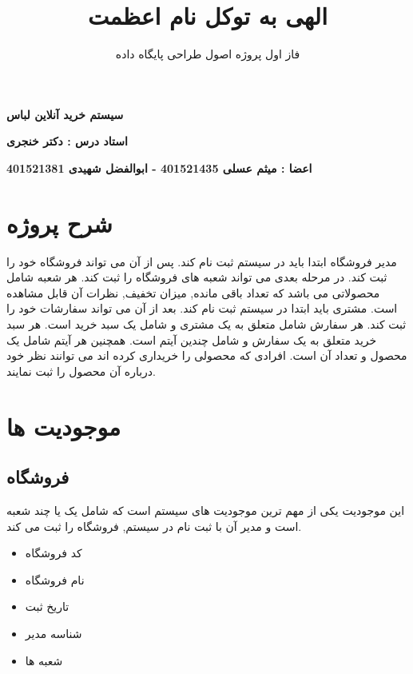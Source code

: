 \documentclass[]{article}
\title{ الهی به توکل نام اعظمت  }
\author{
فاز اول پروژه اصول طراحی پایگاه داده
 }
\begin{document}
\maketitle

\begin{center}
\textbf{سیستم خرید آنلاین لباس}
\end{center}

\begin{center}
\textbf{ استاد درس : دکتر خنجری   }
\end{center}
\begin{center}
\textbf{ اعضا : میثم عسلی 401521435 - ابوالفضل شهیدی 401521381}
\end{center}

\newpage
\tableofcontents
\newpage
\section{شرح پروژه}
مدیر فروشگاه ابتدا باید در سیستم ثبت نام کند. پس از آن می تواند فروشگاه خود را ثبت کند. در مرحله بعدی می تواند شعبه های فروشگاه را ثبت کند. هر شعبه شامل محصولاتی می باشد که تعداد باقی مانده, میزان تخفیف, نظرات آن قابل مشاهده است. 
مشتری باید ابتدا در سیستم ثبت نام کند. بعد از آن می تواند سفارشات خود را ثبت کند.
هر سفارش شامل متعلق به یک مشتری و شامل یک سبد خرید است. 
هر سبد خرید متعلق به یک سفارش و شامل چندین آیتم است.
همچنین هر آیتم شامل یک محصول و تعداد آن است.
افرادی که محصولی را خریداری کرده اند می توانند نظر خود درباره آن محصول را ثبت نمایند. 


\section{موجودیت ها}



\subsection{فروشگاه}
این موجودیت یکی از مهم ترین موجودیت های سیستم است که شامل یک یا چند شعبه است و مدیر آن با ثبت نام در سیستم, فروشگاه را ثبت می کند.
\begin{itemize}
\item کد فروشگاه
\item نام فروشگاه
\item تاریخ ثبت  
\item شناسه مدیر
\item شعبه ها
\end{itemize}
\end{document}
